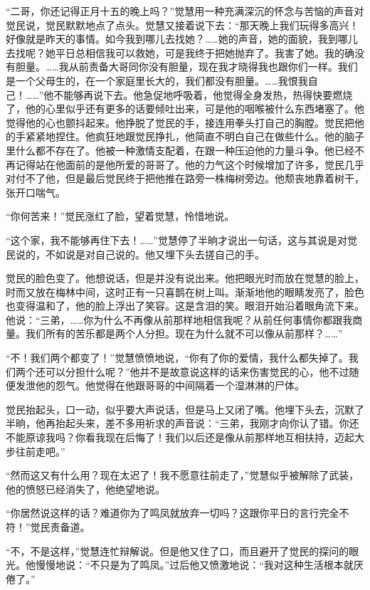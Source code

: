 \par “二哥，你还记得正月十五的晚上吗？”觉慧用一种充满深沉的怀念与苦恼的声音对觉民说，觉民默默地点了点头。觉慧又接着说下去：“那天晚上我们玩得多高兴！好像就是昨天的事情。如今我到哪儿去找她？……她的声音，她的面貌，我到哪儿去找呢？她平日总相信我可以救她，可是我终于把她抛弃了。我害了她。我的确没有胆量。……我从前责备大哥同你没有胆量，现在我才晓得我也跟你们一样。我们是一个父母生的，在一个家庭里长大的，我们都没有胆量。……我恨我自己！……”他不能够再说下去。他急促地呼吸着，他觉得全身发热，热得快要燃烧了，他的心里似乎还有更多的话要倾吐出来，可是他的咽喉被什么东西堵塞了。他觉得他的心也颤抖起来。他挣脱了觉民的手，接连用拳头打自己的胸膛。觉民把他的手紧紧地捏住。他疯狂地跟觉民挣扎，他简直不明白自己在做些什么。他的脑子里什么都不存在了。他被一种激情支配着，在跟一种压迫他的力量斗争。他已经不再记得站在他面前的是他所爱的哥哥了。他的力气这个时候增加了许多，觉民几乎对付不了他，但是最后觉民终于把他推在路旁一株梅树旁边。他颓丧地靠着树干，张开口喘气。
\par “你何苦来！”觉民涨红了脸，望着觉慧，怜惜地说。
\par “这个家，我不能够再住下去！……”觉慧停了半晌才说出一句话，这与其说是对觉民说的，不如说是对自己说的。他又埋下头去搓自己的手。
\par 觉民的脸色变了。他想说话，但是并没有说出来。他把眼光时而放在觉慧的脸上，时而又放在梅林中间，这时正有一只喜鹊在树上叫。渐渐地他的眼睛发亮了，脸色也变得温和了，他的脸上浮出了笑容。这是含泪的笑。眼泪开始沿着眼角流下来。他说：“三弟，……你为什么不再像从前那样地相信我呢？从前任何事情你都跟我商量。我们所有的苦乐都是两个人分担。现在为什么就不可以像从前那样？……”
\par “不！我们两个都变了！”觉慧愤愤地说，“你有了你的爱情，我什么都失掉了。我们两个还可以分担什么呢？”他并不是故意说这样的话来伤害觉民的心，他不过随便发泄他的怨气。他觉得在他跟哥哥的中间隔着一个湿淋淋的尸体。
\par 觉民抬起头，口一动，似乎要大声说话，但是马上又闭了嘴。他埋下头去，沉默了半晌，他再抬起头来，差不多用祈求的声音说：“三弟，我刚才向你认了错。你还不能原谅我吗？你看我现在后悔了！我们以后还是像从前那样地互相扶持，迈起大步往前走吧。”
\par “然而这又有什么用？现在太迟了！我不愿意往前走了，”觉慧似乎被解除了武装，他的愤怒已经消失了，他绝望地说。
\par “你居然说这样的话？难道你为了鸣凤就放弃一切吗？这跟你平日的言行完全不符！”觉民责备道。
\par “不，不是这样，”觉慧连忙辩解说。但是他又住了口，而且避开了觉民的探问的眼光。他慢慢地说：“不只是为了鸣凤。”过后他又愤激地说：“我对这种生活根本就厌倦了。”
